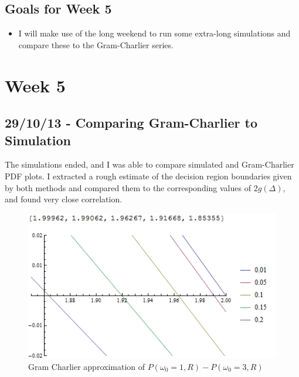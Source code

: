\subsection{Goals for Week 5}

\begin{itemize}
\itemsep1pt\parskip0pt
\item
  I will make use of the long weekend to run some extra-long simulations
  and compare these to the Gram-Charlier series.
\end{itemize}

\section{Week 5}

\subsection{29/10/13 - Comparing Gram-Charlier to Simulation}

The simulations ended, and I was able to compare simulated and
Gram-Charlier PDF plots. I extracted a rough estimate of the decision
region boundaries given by both methods and compared them to the
corresponding values of $2 g(\Delta)$, and found very close correlation.

\begin{figure}[htbp]
\centering
\includegraphics[width=\linewidth]{../../../plots/gcdrb.png}
\caption{Gram Charlier approximation of
$P(\omega_0=1,R)-P(\omega_0=3,R)$}
\end{figure}

